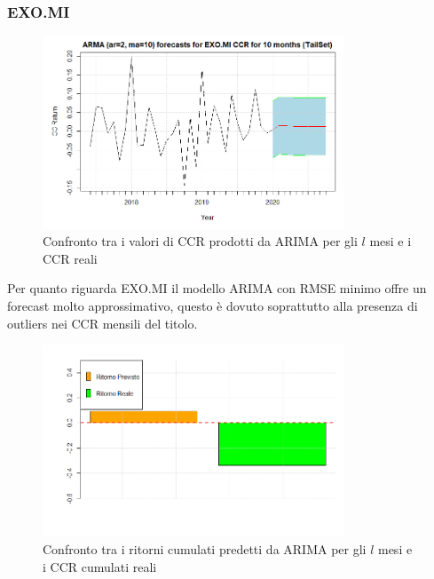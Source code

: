 \documentclass[12pt]{article}
\begin{document}
\subsubsection{EXO.MI}
\begin{figure}[!htb]
    \centering
    \includegraphics[width=0.8\textwidth]{immagini/foreEXO.png}
    \caption{Confronto tra i valori di CCR prodotti da ARIMA per gli $l$ mesi e i CCR reali}
\end{figure}
\FloatBarrier
Per quanto riguarda EXO.MI il modello ARIMA con RMSE minimo offre un forecast molto approssimativo, questo è dovuto soprattutto alla presenza di outliers nei CCR mensili del titolo.
\begin{figure}[!htb]
    \centering
    \includegraphics[width=0.8\textwidth]{immagini/foreEXObar.png}
    \caption{Confronto tra i ritorni cumulati predetti da ARIMA per gli $l$ mesi e i CCR cumulati reali}
\end{figure}
\FloatBarrier
\end{document}

